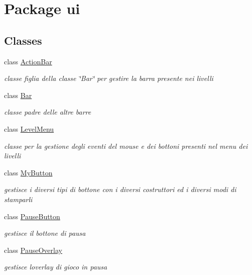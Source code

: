 \hypertarget{namespaceui}{}\section{Package ui}
\label{namespaceui}
\subsection*{Classes}
\begin{DoxyCompactItemize}
\item 
class \hyperlink{classui_1_1_action_bar}{Action\+Bar}
\begin{DoxyCompactList}\small\item\em classe figlia della classe \char`\"{}\+Bar\char`\"{} per gestire la barra presente nei livelli \end{DoxyCompactList}\item 
class \hyperlink{classui_1_1_bar}{Bar}
\begin{DoxyCompactList}\small\item\em classe padre delle altre barre \end{DoxyCompactList}\item 
class \hyperlink{classui_1_1_level_menu}{Level\+Menu}
\begin{DoxyCompactList}\small\item\em classe per la gestione degli eventi del mouse e dei bottoni presenti nel menu dei livelli \end{DoxyCompactList}\item 
class \hyperlink{classui_1_1_my_button}{My\+Button}
\begin{DoxyCompactList}\small\item\em gestisce i diversi tipi di bottone con i diversi costruttori ed i diversi modi di stamparli \end{DoxyCompactList}\item 
class \hyperlink{classui_1_1_pause_button}{Pause\+Button}
\begin{DoxyCompactList}\small\item\em gestisce il bottone di pausa \end{DoxyCompactList}\item 
class \hyperlink{classui_1_1_pause_overlay}{Pause\+Overlay}
\begin{DoxyCompactList}\small\item\em gestisce l\textquotesingle{}overlay di gioco in pausa \end{DoxyCompactList}\item 

\end{DoxyCompactItemize}
